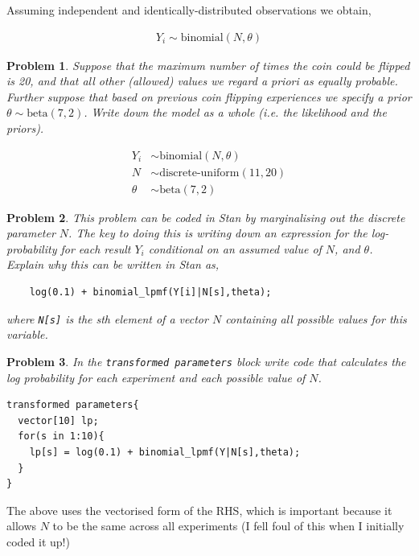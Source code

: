 \documentclass{article}
\newtheorem{problem}{Problem}[section]
\begin{document}
Assuming independent and identically-distributed observations we obtain,

\begin{align}
Y_i\sim \text{binomial}(N,\theta)
\end{align}

\begin{problem}
	Suppose that the maximum number of times the coin could be flipped is 20, and that all other (allowed) values we regard \textit{a priori} as equally probable. Further suppose that based on previous coin flipping experiences we specify a prior $\theta\sim \text{beta}(7,2)$. Write down the model as a whole (i.e. the likelihood and the priors).
\end{problem}

\begin{align}
Y_i &\sim \text{binomial}(N,\theta)\\
N &\sim \text{discrete-uniform}(11,20)\\
\theta &\sim \text{beta}(7,2)
\end{align}

\begin{problem}
	This problem can be coded in Stan by marginalising out the discrete parameter $N$. The key to doing this is writing down an expression for the log-probability for each result $Y_i$ conditional on an assumed value of $N$, and $\theta$. Explain why this can be written in Stan as,
	
	\begin{verbatim}
	log(0.1) + binomial_lpmf(Y[i]|N[s],theta);  
	\end{verbatim}
	
	where \texttt{N[s]} is the sth element of a vector $N$ containing all possible values for this variable.
	
\end{problem}


\begin{problem}
	In the \texttt{transformed parameters} block write code that calculates the log probability for each experiment and each possible value of $N$.
\end{problem}

\begin{verbatim}
transformed parameters{
  vector[10] lp;
  for(s in 1:10){
    lp[s] = log(0.1) + binomial_lpmf(Y|N[s],theta);  
  }
}
\end{verbatim}

The above uses the vectorised form of the RHS, which is important because it allows $N$ to be the same across all experiments (I fell foul of this when I initially coded it up!)
\end{document}
